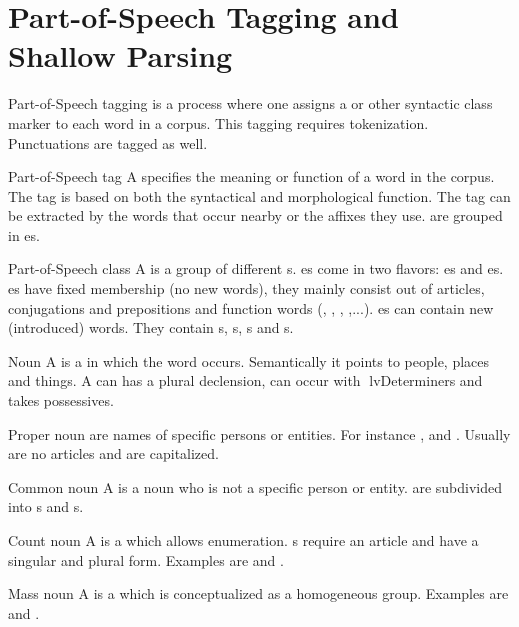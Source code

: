\section{Part-of-Speech Tagging and Shallow Parsing}
\begin{df}{Part-of-Speech tagging}
\sb{} is a process where one assigns a \pos{} or other syntactic class marker to each word in a corpus. This tagging requires tokenization. Punctuations are tagged as well.
\end{df}
\begin{df}{Part-of-Speech tag}
A \sb{} specifies the meaning or function of a word in the corpus. The tag is based on both the syntactical and morphological function. The tag can be extracted by the words that occur nearby or the affixes they use. \sb{} are grouped in es.
\end{df}
\begin{df}{Part-of-Speech class}
A \sb{} is a group of different s. \sb{}es come in two flavors: es and es. es have fixed membership (no new words), they mainly consist out of articles, conjugations and prepositions and function words (, , , ,...). es can contain new (introduced) words. They contain s, s, s and s.
\end{df}
\begin{df}{Noun}
A \sb{} is a  in which the word occurs. Semantically it points to people, places and things. A \sb{} can has a plural declension, can occur with lv{Determiner}s and takes possessives.
\end{df}
\begin{df}{Proper noun}
\sb{} are names of specific persons or entities. For instance ,  and . Usually \sb{} are no articles and are capitalized.
\end{df}
\begin{df}{Common noun}
A \sb{} is a noun who is not a specific person or entity. \sb{} are subdivided into s and s.
\end{df}
\begin{df}{Count noun}
A \sb{} is a  which allows enumeration. \sb{}s require an article and have a singular and plural form. Examples are  and .
\end{df}
\begin{df}{Mass noun}
A \sb{} is a  which is conceptualized as a homogeneous group. Examples are  and .
\end{df}
